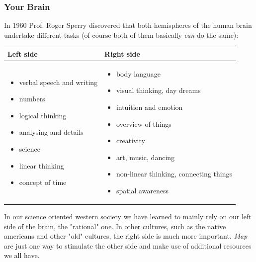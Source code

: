 \documentclass[12pt,a4paper]{article}
\begin{document}
\subsubsection*{Your Brain}
In 1960 Prof. {\sc Roger Sperry} discovered that both hemispheres
of the human brain undertake different tasks (of course both of them
basically {\em can} do the same): 
\begin{center}
\begin{tabular}{|p{5.5cm}|p{5.5cm}|} \hline
    Left side & Right side \\ \hline
    \begin{itemize}
       \item verbal speech and writing 
       \item numbers
       \item logical thinking
       \item analysing and details
       \item science
       \item linear thinking
       \item concept of time
    \end{itemize} &
    \begin{itemize}
        \item body language
        \item visual thinking, day dreams
        \item intuition and emotion
        \item overview of things
        \item creativity
        \item art, music, dancing
        \item non-linear thinking, connecting things
        \item spatial awareness
    \end{itemize}     \\ \hline
\end{tabular}   
\end{center}
In our science oriented western society we have learned to mainly rely on our
left side of the brain, the "rational" one. In other cultures, such as the native americans and other "old" cultures, the right
side is much more important. {\em Map} are just one way to stimulate the
other side and make use of additional resources we all have.
\end{document}
